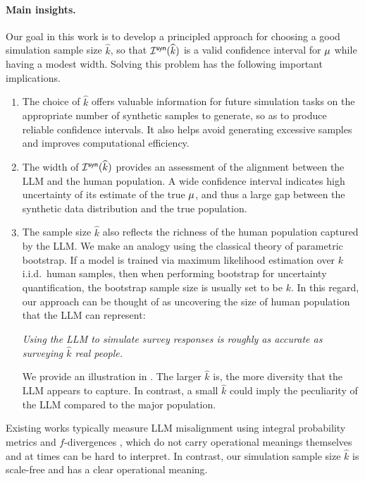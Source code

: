 \paragraph{Main insights.} Our goal in this work is to develop a principled approach for choosing a good simulation sample size $\widehat{k}$, so that $\mathcal{I}^{\mathsf{syn}}( \widehat{k} )$ is a valid confidence interval for $\mu$ while having a modest width. Solving this problem has the following important implications. 
\begin{enumerate}
\item The choice of $\widehat{k}$ offers valuable information for future simulation tasks on the appropriate number of synthetic samples to generate, so as to produce reliable confidence intervals. It also helps avoid generating excessive samples and improves computational efficiency.
\item The width of $\mathcal{I}^{\mathsf{syn}}( \widehat{k} )$ provides an assessment of the alignment between the LLM and the human population. A wide confidence interval indicates high uncertainty of its estimate of the true $\mu$, and thus a large gap between the synthetic data distribution and the true population.
\item The sample size $\widehat{k}$ also reflects the richness of the human population captured by the LLM. We make an analogy using the classical theory of parametric bootstrap. If a model is trained via maximum likelihood estimation over $k$ i.i.d.~human samples, then when performing bootstrap for uncertainty quantification, the bootstrap sample size is usually set to be $k$. In this regard, our approach can be thought of as uncovering the size of human population that the LLM can represent:
\begin{center}
	\emph{Using the LLM to simulate survey responses is roughly as accurate as surveying $\widehat{k}$ real people.}
\end{center}
We provide an illustration in . 
The larger $\widehat{k}$ is, the more diversity that the LLM appears to capture. In contrast, a small $\widehat{k}$ could imply the peculiarity of the LLM compared to the major population. %
\end{enumerate}

\begin{remark}
Existing works typically measure LLM misalignment using integral probability metrics and $f$-divergences \citep{SDL23, DHM24, DNL24}, which do not carry operational meanings themselves and at times can be hard to interpret. In contrast, our simulation sample size $\widehat{k}$ is scale-free and has a clear operational meaning.
\end{remark} 


